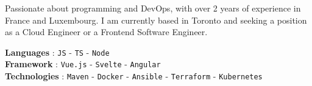 \documentclass[8pt]{developercv} %
\begin{document}
\vspace{0.5cm}




\begin{minipage}[t]{0.4\textwidth} %
	\vspace{-\baselineskip} %
	
	    Passionate about programming and DevOps, with over 2 years of experience in France and Luxembourg. I am currently based in Toronto and seeking a position as a Cloud Engineer or a Frontend Software Engineer.
\end{minipage}
\hfill %
\begin{minipage}[t]{0.5\textwidth} %
	\vspace{-\baselineskip} %
	
	\textbf{Languages}  : \texttt{JS} - \texttt{TS} - \texttt{Node}\\

	\textbf{Framework} :  \texttt{Vue.js} - \texttt{Svelte} - \texttt{Angular}\\
	
	\textbf{Technologies} :  \texttt{Maven} - \texttt{Docker} - \texttt{Ansible} - \texttt{Terraform} - \texttt{Kubernetes}\\

\end{minipage}



\end{document}
